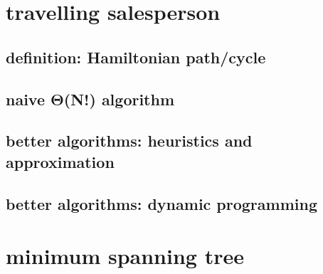 

\section{travelling salesperson}



\subsection{definition: Hamiltonian path/cycle}



\subsection{naive Θ(N!) algorithm}



\subsection{better algorithms: heuristics and approximation}

\subsection{better algorithms: dynamic programming}

\section{minimum spanning tree}

